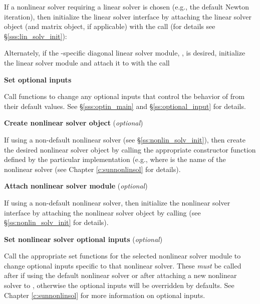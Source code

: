 \begin{Steps}
  If a nonlinear solver requiring a linear solver is chosen (e.g., the default
  Newton iteration), then initialize the {\cvls} linear solver
  interface by attaching the linear solver object (and matrix object, if
  applicable) with the call (for details see
  \S\ref{sss:lin_solv_init}):


  Alternately, if the {\cvodes}-specific diagonal linear solver module,
  {\cvdiag}, is desired, initialize the linear solver module and
  attach it to {\cvodes} with the call


\item
  {\bf Set optional inputs}

  Call  functions to change any
  optional inputs that control the behavior of {\cvodes} from their default values.
  See \S\ref{sss:optin_main} and \S\ref{ss:optional_input} for details.

\item\label{i:nonlin_solver}
  {\bf Create nonlinear solver object} (\textit{optional})

  If using a non-default nonlinear solver (see \S\ref{ss:nonlin_solv_init}),
  then create the desired nonlinear solver object by calling the appropriate
  constructor function defined by the particular {\sunnonlinsol} implementation
  (e.g.,  where \id{***} is the name of the
  nonlinear solver (see Chapter \ref{c:sunnonlinsol} for details).

\item\label{i:nonlin_solver_interface}
  {\bf Attach nonlinear solver module} (\textit{optional})

  If using a non-default nonlinear solver, then initialize the nonlinear solver
  interface by attaching the nonlinear solver object by calling
   (see
  \S\ref{ss:nonlin_solv_init} for details).

\item
  {\bf Set nonlinear solver optional inputs} (\textit{optional})

  Call the appropriate set functions for the selected nonlinear solver module to
  change optional inputs specific to that nonlinear solver. These \textit{must}
  be called after  if using the default nonlinear solver or after
  attaching a new nonlinear solver to {\cvode}, otherwise the optional inputs
  will be overridden by {\cvodes} defaults. See Chapter \ref{c:sunnonlinsol} for
  more information on optional inputs.


\end{Steps}

